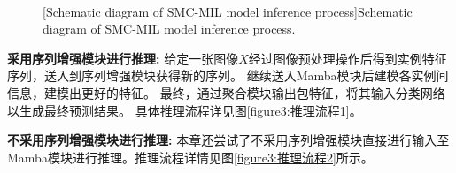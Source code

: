 \begin{figure}[h]
  \centering
  \\
  [Schematic diagram of SMC-MIL model inference process]{Schematic diagram of SMC-MIL model inference process.}
  \label{figure3: 推理流程}
\end{figure}

\textbf{采用序列增强模块进行推理:} 给定一张图像$X$经过图像预处理操作后得到实例特征序列，送入到序列增强模块获得新的序列。
继续送入Mamba模块后建模各实例间信息，建模出更好的特征。
最终，通过聚合模块输出包特征，将其输入分类网络以生成最终预测结果。
具体推理流程详见图\ref{figure3:推理流程1}。

\textbf{不采用序列增强模块进行推理:} 本章还尝试了不采用序列增强模块直接进行输入至Mamba模块进行推理。推理流程详情见图\ref{figure3:推理流程2}所示。

